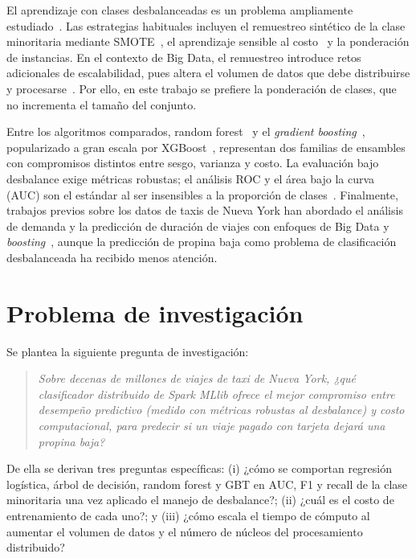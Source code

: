 \documentclass[conference]{IEEEtran}
\begin{document}
El aprendizaje con clases desbalanceadas es un problema ampliamente
estudiado~\cite{he2009imbalanced}. Las estrategias habituales incluyen el
remuestreo sintético de la clase minoritaria mediante SMOTE~\cite{chawla2002smote},
el aprendizaje sensible al costo~\cite{elkan2001costsensitive} y la ponderación de
instancias. En el contexto de Big Data, el remuestreo introduce retos adicionales
de escalabilidad, pues altera el volumen de datos que debe distribuirse y
procesarse~\cite{fernandez2017imbalancedbigdata}. Por ello, en este trabajo se
prefiere la ponderación de clases, que no incrementa el tamaño del conjunto.

Entre los algoritmos comparados, random forest~\cite{breiman2001randomforests} y
el \emph{gradient boosting}~\cite{friedman2001greedy}, popularizado a gran escala
por XGBoost~\cite{chen2016xgboost}, representan dos familias de ensambles con
compromisos distintos entre sesgo, varianza y costo. La evaluación bajo desbalance
exige métricas robustas; el análisis ROC y el área bajo la curva (AUC) son el
estándar al ser insensibles a la proporción de clases~\cite{fawcett2006roc}.
Finalmente, trabajos previos sobre los datos de taxis de Nueva York han abordado el
análisis de demanda y la predicción de duración de viajes con enfoques de Big Data
y \emph{boosting}~\cite{yu2021bigdatataxi,poongodi2022nyc}, aunque la predicción de
propina baja como problema de clasificación desbalanceada ha recibido menos
atención.

\section{Problema de investigación}
Se plantea la siguiente pregunta de investigación:

\begin{quote}
\emph{Sobre decenas de millones de viajes de taxi de Nueva York, ¿qué clasificador
distribuido de Spark MLlib ofrece el mejor compromiso entre desempeño predictivo
(medido con métricas robustas al desbalance) y costo computacional, para predecir
si un viaje pagado con tarjeta dejará una propina baja?}
\end{quote}

De ella se derivan tres preguntas específicas: (i) ¿cómo se comportan regresión
logística, árbol de decisión, random forest y GBT en AUC, F1 y recall de la clase
minoritaria una vez aplicado el manejo de desbalance?; (ii) ¿cuál es el costo de
entrenamiento de cada uno?; y (iii) ¿cómo escala el tiempo de cómputo al aumentar
el volumen de datos y el número de núcleos del procesamiento distribuido?
\end{document}
